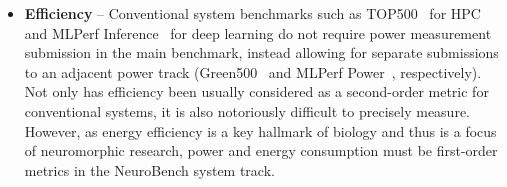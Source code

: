\begin{itemize}
        
        \item \textbf{Efficiency} -- 
        Conventional system benchmarks such as TOP500~\cite{top500} for HPC and MLPerf Inference~\cite{Reddi2020} for deep learning do not require power measurement submission in the main benchmark, instead allowing for separate submissions to an adjacent power track (Green500~\cite{green500} and MLPerf Power~\cite{mlperfpower}, respectively). Not only has efficiency been usually considered as a second-order metric for conventional systems, it is also notoriously difficult to precisely measure. However, as energy efficiency is a key hallmark of biology and thus is a focus of neuromorphic research, power and energy consumption must be first-order metrics in the NeuroBench system track. 
        
        
        
    \end{itemize}

